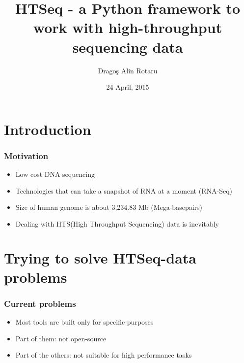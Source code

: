 \documentclass{beamer}
\title[University of Bucharest]{HTSeq - a Python framework to work with high-throughput sequencing data}
\author[Drago\c{s} Alin Rotaru]{Drago\c{s} Alin Rotaru} %
\institute[UniBuc] %
{
University of Bucharest\\ %
}
\date{24 April, 2015} %
\begin{document}
\begin{frame}
\titlepage %
\end{frame}





\section{Introduction} %

\begin{frame}
    \frametitle{Motivation}

    \begin{itemize}
        \item Low cost DNA sequencing
        \pause
        \item Technologies that can take a snapshot of RNA at a moment (RNA-Seq)
        \pause
        \item Size of human genome is about 3,234.83 Mb (Mega-basepairs) 
        \pause
        \item Dealing with HTS(High Throughput Sequencing) data is inevitably
    \end{itemize}
\end{frame}

\section{Trying to solve HTSeq-data problems}

\begin{frame}
    \frametitle{Current problems} 
    \begin{itemize}
        \item Most tools are built only for specific purposes
        \pause
        \item Part of them: not open-source
        \pause
        \item Part of the others: not suitable for high performance tasks
    \end{itemize}
\end{frame}
\end{document}
